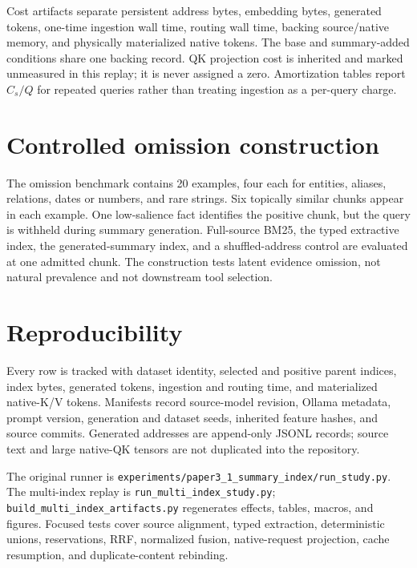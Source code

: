 \documentclass[11pt]{article}
\newcommand{\kv}{K/V\xspace}
\newcommand{\code}[1]{\texttt{#1}}
\begin{document}
Cost artifacts separate persistent address bytes, embedding bytes, generated
tokens, one-time ingestion wall time, routing wall time, backing source/native
memory, and physically materialized native tokens. The base and summary-added
conditions share one backing record. QK projection cost is inherited and
marked unmeasured in this replay; it is never assigned a zero. Amortization
tables report $C_s/Q$ for repeated queries rather than treating ingestion as a
per-query charge.

\section{Controlled omission construction}
\label{app:omission}

The omission benchmark contains 20 examples, four each for entities, aliases,
relations, dates or numbers, and rare strings. Six topically similar chunks
appear in each example. One low-salience fact identifies the positive chunk,
but the query is withheld during summary generation. Full-source BM25, the
typed extractive index, the generated-summary index, and a shuffled-address
control are evaluated at one admitted chunk. The construction tests latent
evidence omission, not natural prevalence and not downstream tool selection.

\section{Reproducibility}
\label{app:reproducibility}

Every row is tracked with dataset identity, selected and positive parent
indices, index bytes, generated tokens, ingestion and routing time, and
materialized native-\kv tokens. Manifests record source-model revision, Ollama
metadata, prompt version, generation and dataset seeds, inherited feature
hashes, and source commits. Generated addresses are append-only JSONL records;
source text and large native-QK tensors are not duplicated into the repository.

The original runner is
\code{experiments/paper3\_1\_summary\_index/run\_study.py}. The multi-index
replay is \code{run\_multi\_index\_study.py};
\code{build\_multi\_index\_artifacts.py} regenerates effects, tables, macros,
and figures. Focused tests cover source alignment, typed extraction,
deterministic unions, reservations, RRF, normalized fusion, native-request
projection, cache resumption, and duplicate-content rebinding.
\end{document}
